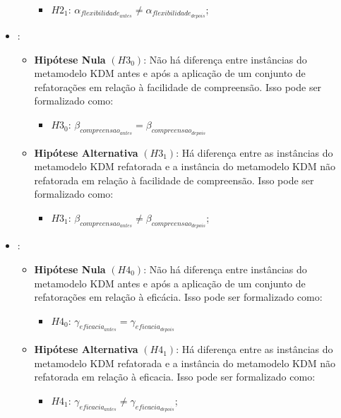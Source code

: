\begin{itemize}
\begin{itemize}
\begin{itemize}
\item $H2_{1}$: $\alpha_{flexibilidade_{antes}} \neq \alpha_{flexibilidade_{depois}}$;
\end{itemize}
\end{itemize}

\item {}:

\begin{itemize}
\item \textbf{Hipótese Nula} \textbf{$(H3_{0})$}: Não há diferença entre instâncias do metamodelo KDM antes e após a aplicação de um conjunto de refatorações em relação à facilidade de compreensão. Isso pode ser formalizado como: 

\begin{itemize}
\item $H3_{0}$: $\beta_{compreensao_{antes}} = \beta_{compreensao_{depois}}$
\end{itemize}

\item \textbf{Hipótese Alternativa} \textbf{$(H3_{1})$}: Há diferença entre as instâncias do metamodelo KDM refatorada e a instância do metamodelo KDM não refatorada em relação à facilidade de compreensão. Isso pode ser formalizado como: 

\begin{itemize}
\item $H3_{1}$: $\beta_{compreensao_{antes}} \neq \beta_{compreensao_{depois}}$;
\end{itemize}
\end{itemize}

\item {}:
    
    \begin{itemize}
\item \textbf{Hipótese Nula} \textbf{$(H4_{0})$}: Não há diferença entre instâncias do metamodelo KDM antes e após a aplicação de um conjunto de refatorações em relação à eficácia. Isso pode ser formalizado como: 

\begin{itemize}
\item $H4_{0}$: $\gamma_{eficacia_{antes}} = \gamma_{eficacia_{depois}}$
\end{itemize}

\item \textbf{Hipótese Alternativa} \textbf{$(H4_{1})$}: Há diferença entre as instâncias do metamodelo KDM refatorada e a instância do metamodelo KDM não refatorada em relação à eficacia. Isso pode ser formalizado como: 

\begin{itemize}
\item $H4_{1}$: $\gamma_{eficacia_{antes}} \neq \gamma_{eficacia_{depois}}$;
\end{itemize}
\end{itemize}

\end{itemize}

